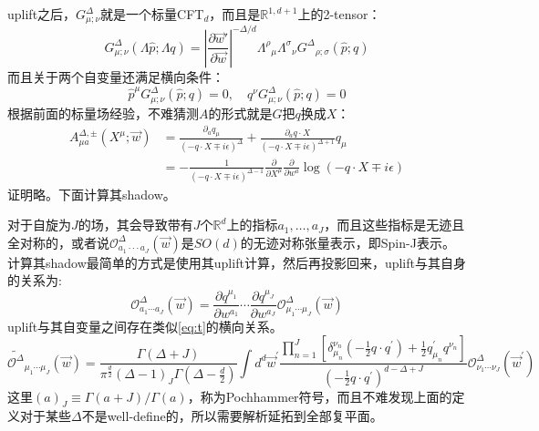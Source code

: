 uplift之后，$G^\Delta_{\mu;\nu}$就是一个标量CFT$_d$，而且是$\mathbb{R}^{1,d+1}$上的2\mbox{-}tensor：
\begin{equation}
	G_{\mu;\nu}^{\Delta}(\Lambda\hat{p};\Lambda q)=\left|\frac{\partial\vec{w}'}{\partial\vec{w}}\right|^{-\Delta/d}\Lambda^{\rho}{}_{\mu}\Lambda^{\sigma}{}_{\nu}G^{\Delta}{}_{\rho;\sigma}(\hat{p};q)
\end{equation}
而且关于两个自变量还满足横向条件：
\begin{equation}\label{eq:t}
	\hat{p}^{\mu}G_{\mu;\nu}^{\Delta}(\hat{p};q)=0,\quad q^{\nu}G_{\mu;\nu}^{\Delta}(\hat{p};q)=0
\end{equation}
根据前面的标量场经验，不难猜测$A$的形式就是$G$把$q$换成$X$：
\begin{equation}
	\boxed{
		\begin{aligned}
			A_{\mu a}^{\Delta,\pm}(X^{\mu};\vec{w})& {=\frac{\partial_{a}q_{\mu}}{(-q\cdot X\mp i\epsilon)^{\Delta}}+\frac{\partial_{a}q\cdot X}{(-q\cdot X\mp i\epsilon)^{\Delta+1}}q_{\mu}} \\
			&=-\frac{1}{(-q\cdot X\mp i\epsilon)^{\Delta-1}}\frac{\partial}{\partial X^{\mu}}\frac{\partial}{\partial w^{a}}\log(-q\cdot X\mp i\epsilon)
		\end{aligned}
	}
\end{equation}
证明略。下面计算其shadow。
\begin{definition}
	对于自旋为$J$的场，其会导致带有$J$个$\mathbb{R}^d$上的指标$a_1,\ldots,a_J$，而且这些指标是无迹且全对称的，或者说$\mathcal{O}^\Delta_{a_1\cdot\cdot\cdot a_J}(\vec{w})$是$SO(d)$的无迹对称张量表示，即Spin\mbox{-}J表示。计算其shadow最简单的方式是使用其uplift计算，然后再投影回来，uplift与其自身的关系为:
	\begin{equation}
		\mathcal{O}^\Delta_{a_1\cdots a_J}(\vec{w})=\frac{\partial q^{\mu_1}}{\partial w^{a_1}}\cdots\frac{\partial q^{\mu_J}}{\partial w^{a_J}}\mathcal{O}^\Delta_{\mu_1\cdots\mu_J}(\vec{w})
	\end{equation}
	uplift与其自变量之间存在类似\ref{eq:t}的横向关系。
	\begin{equation}
		\boxed{
		\widetilde{\mathcal{O}^\Delta}_{\mu_1\cdots\mu_J}(\vec{w})=\frac{\Gamma(\Delta+J)}{\pi^{\frac d2}(\Delta-1)_J\Gamma(\Delta-\frac d2)}\int d^d\vec{w}^{\prime}\frac{\prod_{n=1}^J\left[\delta_{\mu_n}^{\nu_n}(-\frac12q\cdot q^{\prime})+\frac12q_{\mu_n}^{\prime}q^{\nu_n}\right]}{(-\frac12q\cdot q^{\prime})^{d-\Delta+J}}\mathcal{O}^\Delta_{\nu_1\cdots\nu_J}(\vec{w}^{\prime})}
	\end{equation}
	这里$(a)_{J}\equiv\Gamma(a+J)/\Gamma(a)$，称为Pochhammer符号，而且不难发现上面的定义对于某些$\Delta$不是well-define的，所以需要解析延拓到全部复平面。
\end{definition}
